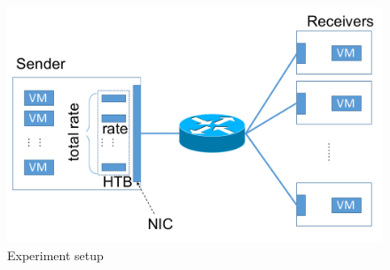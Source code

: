 \begin{figure}[!t]
\centering
\includegraphics[width=\columnwidth]{figs/exp_setup.pdf}
\caption{Experiment setup}
\label{fig:exp-setup} 
\end{figure}
